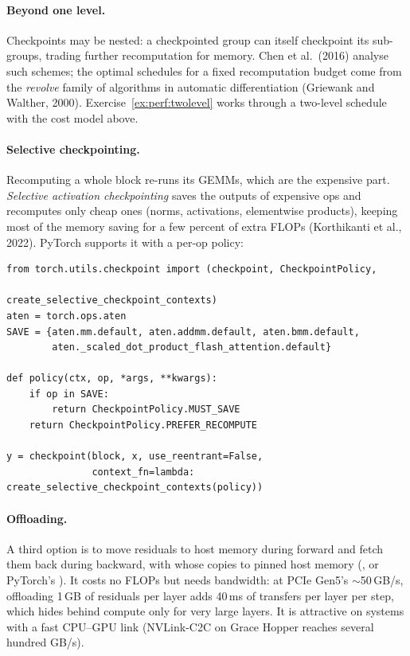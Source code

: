\paragraph{Beyond one level.} Checkpoints may be nested: a checkpointed group can itself checkpoint
its sub-groups, trading further recomputation for memory. Chen et al.\ (2016) analyse such schemes;
the optimal schedules for a fixed recomputation budget come from the \emph{revolve} family of
algorithms in automatic differentiation (Griewank and Walther, 2000). Exercise~\ref{ex:perf:twolevel}
works through a two-level schedule with the cost model above.

\paragraph{Selective checkpointing.} Recomputing a whole block re-runs its GEMMs, which are the
expensive part. \emph{Selective activation checkpointing} saves the outputs of expensive ops and
recomputes only cheap ones (norms, activations, elementwise products), keeping most of the memory
saving for a few percent of extra FLOPs (Korthikanti et al., 2022). PyTorch supports it with a
per-op policy:

\begin{lstlisting}[caption={Selective activation checkpointing: keep matmul outputs, recompute the rest.},label={lst:perf:sac}]
from torch.utils.checkpoint import (checkpoint, CheckpointPolicy,
                                    create_selective_checkpoint_contexts)
aten = torch.ops.aten
SAVE = {aten.mm.default, aten.addmm.default, aten.bmm.default,
        aten._scaled_dot_product_flash_attention.default}

def policy(ctx, op, *args, **kwargs):
    if op in SAVE:
        return CheckpointPolicy.MUST_SAVE
    return CheckpointPolicy.PREFER_RECOMPUTE

y = checkpoint(block, x, use_reentrant=False,
               context_fn=lambda: create_selective_checkpoint_contexts(policy))
\end{lstlisting}

\paragraph{Offloading.} A third option is to move residuals to host memory during forward and fetch
them back during backward, with  whose  copies to pinned
host memory (, or PyTorch's
). It costs no FLOPs but needs bandwidth: at PCIe Gen5's
$\sim$50\,GB/s, offloading 1\,GB of residuals per layer adds 40\,ms of transfers per layer per step,
which hides behind compute only for very large layers. It is attractive on systems with a fast
CPU--GPU link (NVLink-C2C on Grace Hopper reaches several hundred GB/s).


